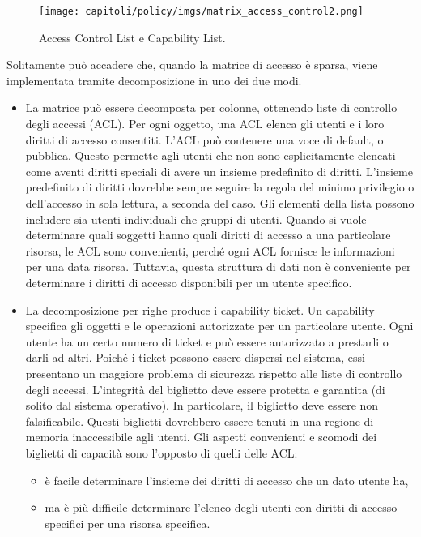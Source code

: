\begin{figure}[H]
      \centering
      \texttt{[image: capitoli/policy/imgs/matrix\_access\_control2.png]}
      \caption{ Access Control List e Capability List.}
\end{figure}
\noindent Solitamente può accadere che, quando la matrice di accesso è sparsa,
viene implementata tramite decomposizione in uno dei due modi.\\
\begin{itemize}
      \item La matrice può essere decomposta per colonne, ottenendo liste di
            controllo degli accessi (ACL). Per ogni oggetto, una ACL elenca gli utenti
            e i loro diritti di accesso consentiti. L'ACL può contenere una voce di
            default, o pubblica. Questo permette agli utenti che non sono
            esplicitamente elencati come aventi diritti speciali di avere un insieme
            predefinito di diritti. L'insieme predefinito di diritti dovrebbe sempre
            seguire la regola del minimo privilegio o dell'accesso in sola lettura, a
            seconda del caso. Gli elementi della lista possono includere sia utenti
            individuali che gruppi di utenti. Quando si vuole determinare quali
            soggetti hanno quali diritti di accesso a una particolare risorsa, le ACL
            sono convenienti, perché ogni ACL fornisce le informazioni per una data
            risorsa. Tuttavia, questa struttura di dati non è conveniente per
            determinare i diritti di accesso disponibili per un utente specifico.
      \item La decomposizione per righe produce i capability ticket. Un
            capability specifica gli oggetti e le operazioni autorizzate per un
            particolare utente. Ogni utente ha un certo numero di ticket e può essere
            autorizzato a prestarli o darli ad altri. Poiché i ticket possono essere
            dispersi nel sistema, essi presentano un maggiore problema di sicurezza
            rispetto alle liste di controllo degli accessi. L'integrità del biglietto
            deve essere protetta e garantita (di solito dal sistema operativo). In
            particolare, il biglietto deve essere non falsificabile. Questi biglietti
            dovrebbero essere tenuti in una regione di memoria inaccessibile agli
            utenti.  Gli aspetti convenienti e scomodi dei biglietti di capacità sono
            l'opposto di quelli delle ACL:
            \begin{itemize}
                  \item è facile determinare l'insieme dei diritti di accesso
                        che un dato utente ha,
                  \item ma è più difficile determinare l'elenco degli utenti con
                        diritti di accesso specifici per una risorsa specifica.
            \end{itemize}
\end{itemize}